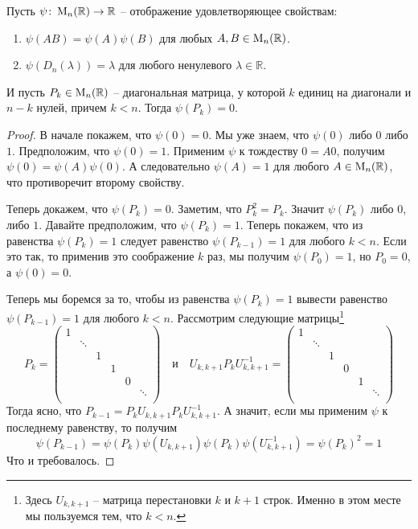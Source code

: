 \begin{claim}\label{claim::MultiOnIdempotent}
Пусть $\psi\colon \operatorname{M}_{n}(\mathbb R)\to \mathbb R$ -- отображение удовлетворяющее свойствам:
\begin{enumerate}
\item $\psi(AB) = \psi(A)\psi(B)$ для любых $A,B\in\operatorname{M}_{n}(\mathbb R)$.

\item $\psi(D_n(\lambda)) = \lambda$ для любого ненулевого $\lambda\in\mathbb R$.
\end{enumerate}
И пусть $P_k\in\operatorname{M}_{n}(\mathbb R)$ -- диагональная матрица, у которой $k$ единиц на диагонали и $n-k$ нулей, причем $k< n$. Тогда $\psi(P_k) = 0$.
\end{claim}
\begin{proof}
В начале покажем, что $\psi(0) = 0$. Мы уже знаем, что $\psi(0)$ либо $0$ либо $1$. Предположим, что $\psi(0)=1$. Применим $\psi$ к тождеству $0 = A 0$, получим $\psi(0) = \psi(A)\psi(0)$. А следовательно $\psi(A) = 1$ для любого $A\in\operatorname{M}_{n}(\mathbb R)$, что противоречит второму свойству.

Теперь докажем, что $\psi(P_k) = 0$. Заметим, что $P_k^2 = P_k$. Значит $\psi(P_k)$ либо $0$, либо $1$. Давайте предположим, что $\psi(P_k) = 1$. Теперь покажем, что из равенства $\psi(P_k) = 1$ следует равенство $\psi(P_{k-1}) = 1$ для любого $k < n$. Если это так, то применив это соображение $k$ раз, мы получим $\psi(P_0) = 1$, но $P_0 = 0$, а $\psi(0) = 0$. 

Теперь мы боремся за то, чтобы из равенства $\psi(P_k) = 1$ вывести равенство $\psi(P_{k-1}) = 1$ для любого $k < n$. Рассмотрим следующие матрицы\footnote{Здесь $U_{k, k+1}$ -- матрица перестановки $k$ и $k+1$ строк. Именно в этом месте мы пользуемся тем, что $k<n$.}
\[
P_k=
\begin{pmatrix}
{1}&{}&{}&{}&{}&{}\\
{}&{\ddots}&{}&{}&{}&{}\\
{}&{}&{1}&{}&{}&{}\\
{}&{}&{}&{1}&{}&{}\\
{}&{}&{}&{}&{0}&{}\\
{}&{}&{}&{}&{}&{\ddots}\\
\end{pmatrix}
\quad\text{и}\quad
U_{k,k+1}P_kU_{k,k+1}^{-1}=
\begin{pmatrix}
{1}&{}&{}&{}&{}&{}\\
{}&{\ddots}&{}&{}&{}&{}\\
{}&{}&{1}&{}&{}&{}\\
{}&{}&{}&{0}&{}&{}\\
{}&{}&{}&{}&{1}&{}\\
{}&{}&{}&{}&{}&{\ddots}\\
\end{pmatrix}
\]
Тогда ясно, что $P_{k-1} = P_k U_{k,k+1}P_k U_{k,k+1}^{-1}$. А значит, если мы применим $\psi$ к последнему равенству, то получим
\[
\psi(P_{k-1}) = \psi(P_k)\psi(U_{k,k+1})\psi(P_k)\psi(U_{k,k+1}^{-1}) = \psi(P_k)^2 = 1
\]
Что и требовалось.
\end{proof}


